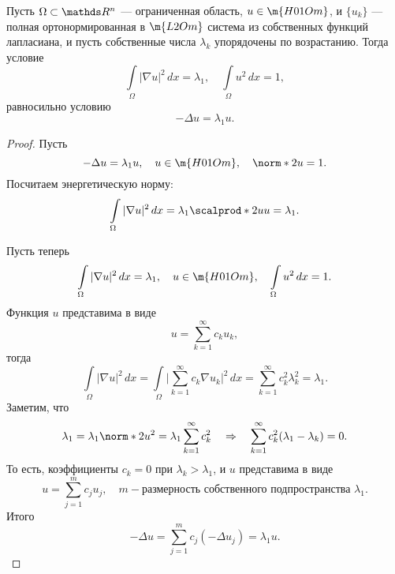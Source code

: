 \begin{theorem}  Пусть $\Omega \subset \real^n$ --- ограниченная область, $u \in \m{H01Om}$, и $\{ u_k \}$ --- полная ортонормированная в $\m{L2Om}$ система из собственных функций лапласиана, и пусть собственные числа $\lambda_k$ упорядочены по возрастанию. Тогда условие
$$ \int \limits_\Omega | \nabla u|^2 \,dx = \lambda_1, \quad \int \limits_\Omega u^2 \, dx = 1,$$
равносильно условию
$$ - \Delta u = \lambda_1 u .$$
\end{theorem}
\begin{proof} Пусть
$$ - \Delta u = \lambda_1 u, \quad u \in \m{H01Om}, \quad \norm*{2}{u} = 1.$$
Посчитаем энергетическую норму:
$$ \int \limits_\Omega |\nabla u|^2 \, dx = \lambda_1 \scalprod*{2}{u}{u} = \lambda_1.$$

Пусть теперь
$$\int \limits_\Omega | \nabla u|^2 \,dx = \lambda_1, \quad u \in \m{H01Om}, \quad \int \limits_\Omega u^2 \, dx = 1.$$
Функция $u$ представима в виде
$$ u = \sum_{k=1}^\infty c_k u_k,$$
тогда
$$ \int \limits_\Omega | \nabla u|^2 \, dx = \int \limits_\Omega \Bigg| \sum_{k=1}^\infty c_k \nabla u_k \Bigg|^2 \, dx = \sum_{k=1}^\infty c_k^2 \lambda_k^2 = \lambda_1.$$
Заметим, что
$$ \lambda_1 = \lambda_1 \norm*{2}{u}^2 = \lambda_1 \sum_{k=1}^\infty c_k^2 \quad \Rightarrow \quad \sum_{k=1}^\infty c_k^2 (\lambda_1 - \lambda_k) = 0.$$
То есть, коэффициенты $c_k=0$ при $\lambda_k > \lambda_1$, и $u$ представима в виде
$$ u = \sum_{j=1}^m c_j u_j, \quad m - \text{размерность собственного подпространства } \lambda_1.$$
Итого
$$ - \Delta u = \sum_{j=1}^m c_j  (- \Delta u_j) = \lambda_1 u.$$

\end{proof}